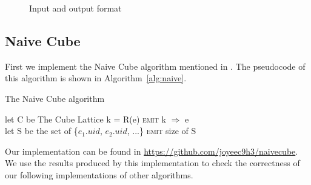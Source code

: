 \documentclass{article}
\begin{document}
\begin{figure}[h]
\centering
\hfill
{}
\hfill
{}
\hfill
\caption{Input and output format}
\label{fig:example}
\end{figure}

\subsection{Naive Cube}

First we implement the Naive Cube algorithm mentioned in \cite{nandi2012data}. The pseudocode of this algorithm is shown in Algorithm~\ref{alg:naive}.

\begin{algorithm}[h]
\centering
\caption{The Naive Cube algorithm}
\label{alg:naive}
  \begin{algorithmic}[1]
      \State let C be The Cube Lattice
        	\State k = R(e)
        	\State \textsc{emit} k $\Rightarrow$ e
        \EndFor
      \EndFor
    \EndFunction
\\
      \State let S be the set of \{$e_{1}.uid$, $e_{2}.uid$, ...\}
      \State \textsc{emit} size of S
    \EndFunction
  \end{algorithmic}
\end{algorithm}

Our implementation can be found in \url{https://github.com/joyeec9h3/naivecube}. We use the results produced by this implementation to check the correctness of our following implementations of other algorithms.
\end{document}
